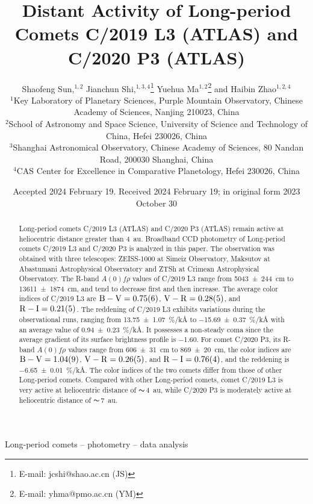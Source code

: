 \documentclass[fleqn,usenatbib]{mnras}
\title[Distant Activity of C/2019 L3 and C/2020 P3]{Distant Activity of Long-period Comets C/2019 L3 (ATLAS) and C/2020 P3 (ATLAS)}
\author[Shaofeng Sun et al.]{
Shaofeng Sun,$^{1,2}$
Jianchun Shi,$^{1,3,4}$\thanks{E-mail: jcshi@shao.ac.cn (JS)}\orcidlink{https://orcid.org/0000-0001-5654-5972}
Yuehua Ma$^{1,2}$\thanks{E-mail: yhma@pmo.ac.cn (YM)}
and Haibin Zhao$^{1,2,4}$
\\
$^{1}$Key Laboratory of Planetary Sciences, Purple Mountain Observatory, Chinese Academy of Sciences, Nanjing 210023, China\\
$^{2}$School of Astronomy and Space Science, University of Science and Technology of China, Hefei 230026, China\\
$^{3}$Shanghai Astronomical Observatory, Chinese Academy of Sciences, 80 Nandan Road, 200030 Shanghai, China\\
$^{4}$CAS Center for Excellence in Comparative Planetology, Hefei 230026, China
}
\date{Accepted 2024 February 19. Received 2024 February 19; in original form 2023 October 30}
\begin{document}
\label{firstpage}
\pagerange{\pageref{firstpage}--\pageref{lastpage}}
\maketitle


\begin{abstract}
	Long-period comets C/2019 L3 (ATLAS) and C/2020 P3 (ATLAS) remain active at heliocentric distance greater than {\qty{4}{\astronomicalunit}}. Broadband CCD photometry of Long-period comets C/2019 L3 and C/2020 P3 is analyzed in this paper.
	The observation was obtained with three telescopes: ZEISS-1000 at Simeiz Observatory, Maksutov at Abastumani Astrophysical Observatory and ZTSh at Crimean Astrophysical Observatory. The R-band $A(0)f\rho$ values of C/2019 L3 range from {\qty{5043 +- 244}{\cm}} to {\qty{13611 +- 1874}{\cm}}, and tend to decrease first and then increase. The average color indices of C/2019 L3 are $\mathrm{B-V} = \num{0.75 +- 0.06}$, $\mathrm{V-R} = \num{0.28 +- 0.05}$, and $\mathrm{R-I} = \num{0.21 +- 0.05}$. The reddening of C/2019 L3 exhibits variations during the observational runs, ranging from {\qty{13.75 +- 1.07}{\percent/\kilo\angstrom}} to {\qty{-15.69 +- 0.37}{\percent/\kilo\angstrom}} with an average value of {\qty{0.94 +- 0.23}{\percent/\kilo\angstrom}}. It possesses a non-steady coma since the average gradient of its surface brightness profile is \num{-1.60}. For comet C/2020 P3, its R-band $A(0)f\rho$ values range from {\qty{606 +- 31}{\cm}} to {\qty{869 +- 20}{\cm}}, the color indices are $\mathrm{B-V} = \num{1.04 +- 0.09}$, $\mathrm{V-R} = \num{0.26 +- 0.05}$, and $\mathrm{R-I} = \num{0.76 +- 0.04}$, and the reddening is {\qty{-6.65 +- 0.01}{\percent/\kilo\angstrom}}. The color indices of the two comets differ from those of other Long-period comets. Compared with other Long-period comets, comet C/2019 L3 is very active at heliocentric distance of $\thicksim${\qty{4}{\astronomicalunit}}, while C/2020 P3 is moderately active at heliocentric distance of $\thicksim${\qty{7}{\astronomicalunit}}. 
\end{abstract}

\begin{keywords}
Long-period comets -- photometry -- data analysis
\end{keywords}

\end{document}
